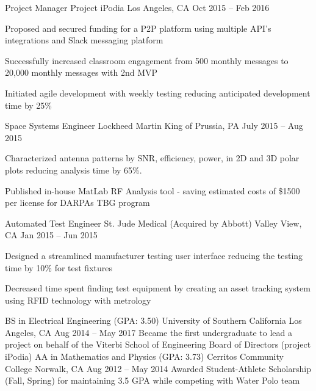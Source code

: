 \documentclass[]{awesome-cv}
\begin{document}
\vspace{-3mm}
\begin{cventries}
	\cventry
	{Project Manager}
	{Project iPodia}
	{Los Angeles, CA}
	{Oct 2015 – Feb 2016}
	{\begin{cvitems}
		\item {Proposed and secured funding for a P2P platform using multiple API’s integrations and Slack messaging platform}
		\item {Successfully increased classroom engagement from 500 monthly messages to 20,000 monthly messages with 2nd MVP}
		\item {Initiated agile development with weekly testing reducing anticipated development time by 25\%}
		\end{cvitems}}
	\cventry
	{Space Systems Engineer}
	{Lockheed Martin}
	{King of Prussia, PA}
	{July 2015 – Aug 2015}
	{\begin{cvitems}
		\item {Characterized antenna patterns by SNR, efficiency, power, in 2D and 3D polar plots reducing analysis time by 65\%.}
		\item {Published in-house MatLab RF Analysis tool - saving estimated costs of \$1500 per license for DARPA\textquotesingle{}s TBG program}
		\end{cvitems}}
	\cventry
	{Automated Test Engineer}
	{St. Jude Medical (Acquired by Abbott)}
	{Valley View, CA}
	{Jan 2015 – Jun 2015}
	{\begin{cvitems}
		\item {Designed a streamlined manufacturer testing user interface reducing the testing time by 10\% for test fixtures}
		\item {Decreased time spent finding test equipment by creating an asset tracking system using RFID technology with metrology}
		\end{cvitems}}
\end{cventries}

\vspace{-3mm}
\begin{cventries}
	\cventry
	{BS in Electrical Engineering (GPA: 3.50)}
	{University of Southern California}
	{Los Angeles, CA}
	{Aug 2014 – May 2017}
	{Became the first undergraduate to lead a project on behalf of the Viterbi School of Engineering Board of Directors (project iPodia)}
	\cventry
	{AA in Mathematics and Physics (GPA: 3.73)}
	{Cerritos Community College}
	{Norwalk, CA}
	{Aug 2012 – May 2014}
	{Awarded Student-Athlete Scholarship (Fall, Spring) for maintaining 3.5 GPA while competing with Water Polo team}
\end{cventries}
\end{document}
